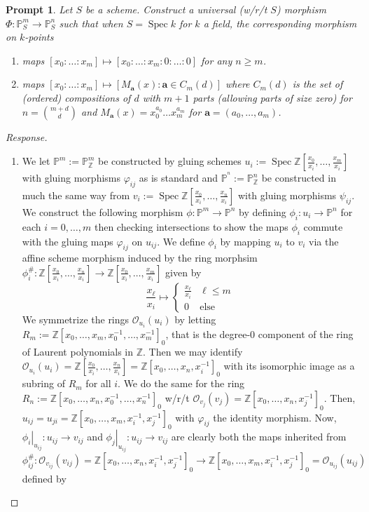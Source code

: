 \documentclass[english,letter,doublesided]{article}
\renewcommand\vec{\mathbf}
\newcommand{\evat}[3]{\left. #1\right|_{#2}^{#3}}
\DeclareMathOperator{\spec}{Spec}
\newcommand{\ZZ}{\mathbb{Z}}
\newcommand{\OO}{\mathcal{O}}
\newcommand{\PP}{\mathbb{P}}
\newtheorem*{prompt*}{Prompt}
\theoremstyle{remark}
\theoremstyle{definition}
\newcommand{\restr}[2]{{\evat{#1}{#2}{}}}
\newcommand{\gph}{\varphi}
\newcommand{\fv}[2]{\frac{x_{#1}}{x_{#2}}}
\begin{document}
\begin{prompt*}
Let $S$ be a scheme. Construct a universal (w/r/t $S$) morphism $\Phi:\PP^m_S\to \PP^n_S$ such that when $S=\spec k$ for $k$ a field, the corresponding morphism on $k$-points
\begin{enumerate}[label=\textit{(\roman*)}]
	\item maps $[x_0:\hdots:x_m]\mapsto [x_0:\hdots:x_m:0:\hdots:0]$ for any $n\geq m$. 
	\item maps $[x_0:\hdots:x_m]\mapsto [M_{\vec{a}}(x):\vec{a}\in C_m(d)]$ where $C_m(d)$ is the set of (ordered) compositions of $d$ with $m+1$ parts (allowing parts of size zero) for $n={m+d\choose d}$ and $M_{\vec{a}}(x)=x_0^{a_0}\hdots x_m^{a_m}$ for $\vec{a}=(a_0,\hdots,a_m)$.
\end{enumerate}
\end{prompt*}\begin{proof}[Response]
\begin{enumerate}[label=\textit{(\roman*)}]
	\item We let $\PP^m:=\PP^m_\ZZ$ be constructed by gluing schemes $u_i:= 
	\spec\ZZ[\fv{0}{i},\hdots,\fv{m}{i}]$ with gluing morphisms $\gph_{ij}$ as is standard and $\PP^^n:=\PP^n_\ZZ$ be constructed in much the same way from $v_i:= \spec\ZZ[\fv{0}{i},\hdots,\fv{n}{i}]$ with gluing morphisms $\psi_{ij}$. We construct the following morphism $\phi: \PP^m\to \PP^n$ by defining $\phi_i:u_i\to \PP^n$ for each $i=0,\hdots,m$ then checking intersections to show the maps $\phi_i$ commute with the gluing maps $\varphi_{ij}$ on $u_{ij}$. We define $\phi_i$ by mapping $u_i$ to $v_i$ via the affine scheme morphism induced by the ring morphsim $\phi_i^\#:\ZZ[\fv{0}{i},\hdots,\fv{n}{i}] \to \ZZ[\fv{0}{i},\hdots,\fv{m}{i}]$ given by \begin{equation*}\fv{\ell}{i}\mapsto\begin{cases}\fv{\ell}{i}&\ell\leq m\\0&\text{else}\end{cases}\end{equation*}
	We symmetrize the rings $\OO_{u_i}(u_i)$ by letting $R_m:=\ZZ[x_0,\hdots,x_m,x_0^{-1},\hdots,x_m^{-1}]_0$, that is the degree-0 component of the ring of Laurent polynomials in $\ZZ$. Then we may identify $\OO_{u_i}(u_i)=\ZZ[\fv{0}{i},\hdots,\fv{n}{i}]=\ZZ[x_0,\hdots,x_n,x_i^{-1}]_0$ with its isomorphic image as a subring of $R_m$ for all $i$. We do the same for the ring $R_n:=\ZZ[x_0,\hdots,x_n,x_0^{-1},\hdots,x_n^{-1}]_0$ w/r/t $\OO_{v_j}(v_j)=\ZZ[x_0,\hdots,x_n,x_j^{-1}]_0$. Then, $u_{ij}=u_{ji}=\ZZ[x_0,\hdots,x_m,x_i^{-1},x_j^{-1}]_0$ with $\gph_{ij}$ the identity morphism. Now, $\restr{\phi_i}{u_{ij}}:u_{ij}\to v_{ij}$ and $\restr{\phi_j}{u_{ij}}:u_{ij}\to v_{ij}$ are clearly both the maps inherited from $\phi_{ij}^\#:\OO_{v_{ij}}(v_{ij})= \ZZ[x_0,\hdots,x_n,x_i^{-1},x_j^{-1}]_0\to \ZZ[x_0,\hdots,x_m,x_i^{-1},x_j^{-1}]_0=\OO_{u_{ij}}(u_{ij})$ defined by \begin{equation*}

\end{equation*}
\end{enumerate}
\end{proof}
\end{document}
